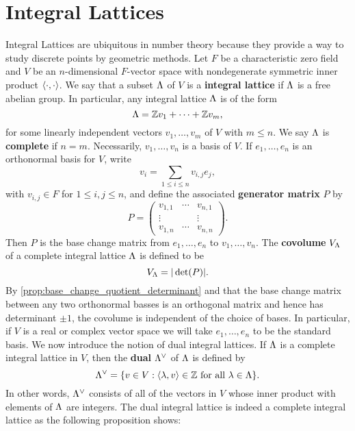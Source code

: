   \section{Integral Lattices}
    Integral Lattices are ubiquitous in number theory because they provide a way to study discrete points by geometric methods. Let $F$ be a characteristic zero field and $V$ be an $n$-dimensional $F$-vector space with nondegenerate symmetric inner product $\langle\cdot,\cdot\rangle$. We say that a subset $\Lambda$ of $V$ is a \textbf{integral lattice} if $\Lambda$ is a free abelian group. In particular, any integral lattice $\Lambda$ is of the form
    \[
      \Lambda = \mathbb{Z} v_{1}+\cdots+\mathbb{Z} v_{m},
    \]
    for some linearly independent vectors $v_{1},\ldots,v_{m}$ of $V$ with $m \le n$. We say $\Lambda$ is \textbf{complete} if $n = m$. Necessarily, $v_{1},\ldots,v_{n}$ is a basis of $V$. If $e_{1},\ldots,e_{n}$ is an orthonormal basis for $V$, write
    \[
      v_{i} = \sum_{1 \le i \le n}v_{i,j}e_{j},
    \]
    with $v_{i,j} \in F$ for $1 \le i,j \le n$, and define the associated \textbf{generator matrix} $P$ by
    \[
      P = \begin{pmatrix} v_{1,1} & \cdots & v_{n,1} \\ \vdots & & \vdots \\ v_{1,n} & \cdots & v_{n,n} \end{pmatrix}.
    \]
    Then $P$ is the base change matrix from $e_{1},\ldots,e_{n}$ to $v_{1},\ldots,v_{n}$. The \textbf{covolume} $V_{\Lambda}$ of a complete integral lattice $\Lambda$ is defined to be
    \[
      V_{\Lambda} = |\det(P)|.
    \]
    By \cref{prop:base_change_quotient_determinant} and that the base change matrix between any two orthonormal basses is an orthogonal matrix and hence has determinant $\pm 1$, the covolume is independent of the choice of bases. In particular, if $V$ is a real or complex vector space we will take $e_{1},\ldots,e_{n}$ to be the standard basis. We now introduce the notion of dual integral lattices. If $\Lambda$ is a complete integral lattice in $V$, then the \textbf{dual} $\Lambda^{\vee}$ of $\Lambda$ is defined by
    \[
      \Lambda^{\vee} = \{v \in V:\text{$\langle\lambda,v\rangle \in \mathbb{Z}$ for all $\lambda \in \Lambda$}\}.
    \]
    In other words, $\Lambda^{\vee}$ consists of all of the vectors in $V$ whose inner product with elements of $\Lambda$ are integers. The dual integral lattice is indeed a complete integral lattice as the following proposition shows:

